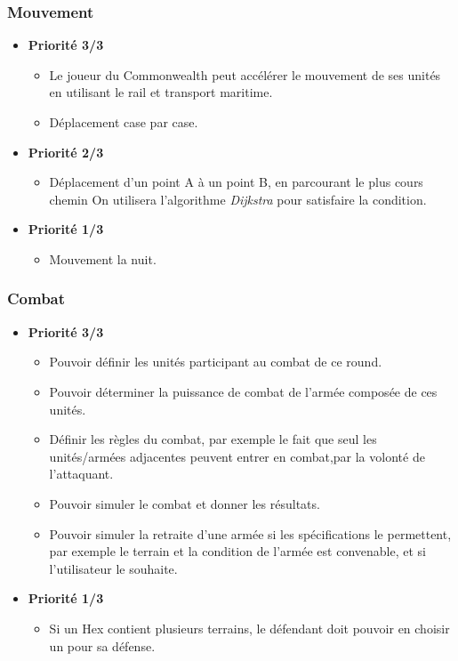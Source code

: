 \documentclass{article}[a4paper, 12pt]
\begin{document}
\subsubsection{Mouvement}
\begin{itemize}
    \item \textbf{Priorité 3/3}
    \begin{itemize}
        \item Le joueur du Commonwealth peut accélérer le mouvement de ses unités en utilisant le rail et transport maritime.
        \item Déplacement case par case.
    \end{itemize}
    \item \textbf{Priorité 2/3}
    \begin{itemize}
        \item Déplacement d'un point A à un point B, en parcourant le plus cours chemin
            On utilisera l'algorithme \emph{Dijkstra} pour satisfaire la condition.
    \end{itemize}   
    \item \textbf{Priorité 1/3}
    \begin{itemize}
        \item Mouvement la nuit.
    \end{itemize}
\end{itemize}

\subsubsection{Combat}
\begin{itemize}
    \item \textbf{Priorité 3/3}
    \begin{itemize}
        \item Pouvoir définir les unités participant au combat de ce round.
        \item Pouvoir déterminer la puissance de combat de l'armée composée de ces unités.
        \item Définir les règles du combat, par exemple le fait que seul les unités/armées adjacentes peuvent entrer en combat,par la volonté de l'attaquant.
        \item Pouvoir simuler le combat et donner les résultats.
        \item Pouvoir simuler la retraite d'une armée si les spécifications le permettent, par exemple le terrain et la condition de l'armée est convenable, et si l'utilisateur le souhaite.
    \end{itemize}
    \item \textbf{Priorité 1/3}
    \begin{itemize}
        \item Si un Hex contient plusieurs terrains, le défendant doit pouvoir en choisir un pour sa défense.
    \end{itemize}
\end{itemize}
\end{document}
